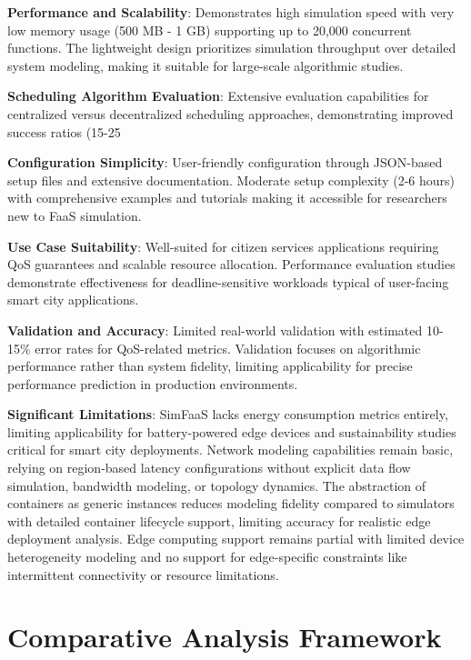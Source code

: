 \textbf{Performance and Scalability}: Demonstrates high simulation speed with very low memory usage (500 MB - 1 GB) supporting up to 20,000 concurrent functions. The lightweight design prioritizes simulation throughput over detailed system modeling, making it suitable for large-scale algorithmic studies.

\textbf{Scheduling Algorithm Evaluation}: Extensive evaluation capabilities for centralized versus decentralized scheduling approaches, demonstrating improved success ratios (15-25%

\textbf{Configuration Simplicity}: User-friendly configuration through JSON-based setup files and extensive documentation. Moderate setup complexity (2-6 hours) with comprehensive examples and tutorials making it accessible for researchers new to FaaS simulation.

\textbf{Use Case Suitability}: Well-suited for citizen services applications requiring QoS guarantees and scalable resource allocation. Performance evaluation studies demonstrate effectiveness for deadline-sensitive workloads typical of user-facing smart city applications.

\textbf{Validation and Accuracy}: Limited real-world validation with estimated 10-15\% error rates for QoS-related metrics. Validation focuses on algorithmic performance rather than system fidelity, limiting applicability for precise performance prediction in production environments.

\textbf{Significant Limitations}: SimFaaS lacks energy consumption metrics entirely, limiting applicability for battery-powered edge devices and sustainability studies critical for smart city deployments. Network modeling capabilities remain basic, relying on region-based latency configurations without explicit data flow simulation, bandwidth modeling, or topology dynamics. The abstraction of containers as generic instances reduces modeling fidelity compared to simulators with detailed container lifecycle support, limiting accuracy for realistic edge deployment analysis. Edge computing support remains partial with limited device heterogeneity modeling and no support for edge-specific constraints like intermittent connectivity or resource limitations.


\section{Comparative Analysis Framework}

